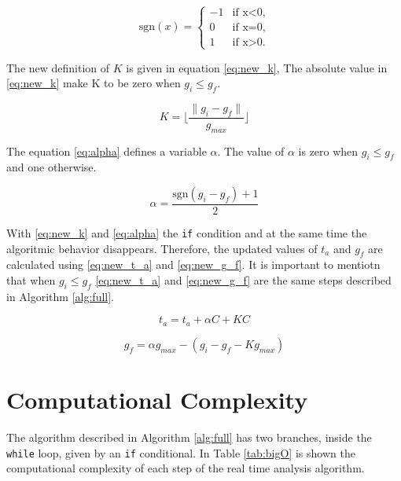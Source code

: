 \documentclass[
  12pt,
  a4paperpaper,
]{report}
\begin{document}
\begin{equation}
\mathrm{sgn}(x)=
    \begin{cases}
        -1  & \text{if    x<0,}\\
        0   & \text{if    x=0,}\\
        1   & \text{if    x>0.}
    \end{cases} 
\end{equation}

The new definition of  \(K\) is given in equation \ref{eq:new_k},
The absolute value in \ref{eq:new_k} make K to be zero when \(g_i \leq g_f\).

\begin{equation}
K = \lfloor \frac{ \| g_i - g_f \|}{g_{max}} \rfloor
\label{eq:new_k}
\end{equation}

The equation \ref{eq:alpha} defines a variable \(\alpha\).
The value of \(\alpha\) is zero when \(g_i \leq g_f\) and one otherwise.

\begin{equation}
\alpha =  \frac{ \mathrm{sgn}(g_i-g_f) + 1 }{2}
\label{eq:alpha}
\end{equation}

With \ref{eq:new_k} and \ref{eq:alpha} the \texttt{if} condition and at the same time the algoritmic behavior disappears. 
Therefore, the updated values of \(t_a\) and \(g_f\) are calculated using
\ref{eq:new_t_a} and \ref{eq:new_g_f}. 
It is important to mentiotn that  when
\(g_i \leq g_f\) \ref{eq:new_t_a} and \ref{eq:new_g_f} are the same steps described in Algorithm \ref{alg:full}.

\begin{equation}
t_a = t_a + \alpha C+ KC
\label{eq:new_t_a}
\end{equation}

\begin{equation}
g_f = \alpha g_{max} - (g_i -  g_f - K g_{max} )
\label{eq:new_g_f}
\end{equation}

\hypertarget{computational-complexity}{%
\section{Computational Complexity}\label{computational-complexity}}

The algorithm described in Algorithm \ref{alg:full} has two branches,
inside the \texttt{while} loop, given by an \texttt{if} conditional. In
Table \ref{tab:bigO} is shown the computational complexity of each step
of the real time analysis algorithm.
\end{document}
